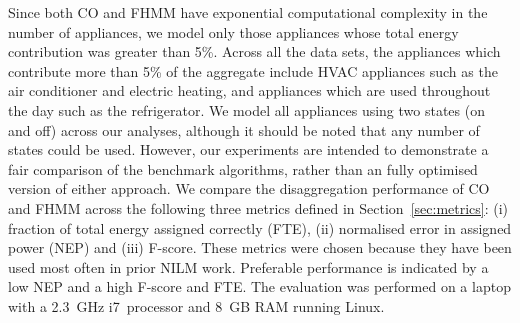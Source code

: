 \documentclass{sig-alternate}
\newcommand{\redcolor}[1]{\textcolor{red}{#1}}
\newcommand{\secref}[1]{Section~\ref{#1}}
\newcommand{\tabref}[1]{Table~\ref{#1}}
\begin{document}
Since both CO and FHMM have exponential computational complexity in the number of appliances, we model only those appliances whose total energy contribution was greater than 5\%. Across all the data sets, the appliances which contribute more than 5\% of the aggregate include HVAC appliances such as the air conditioner and electric heating, and appliances which are used throughout the day such as the refrigerator. We model all appliances using two states (on and off) across our analyses, although it should be noted that any number of states could be used. However, our experiments are intended to demonstrate a fair comparison of the benchmark algorithms, rather than an fully optimised version of either approach.
We compare the disaggregation performance of CO and FHMM across the following three metrics defined in \secref{sec:metrics}: (i) fraction of total energy assigned correctly (FTE), (ii) normalised error in assigned power (NEP) and (iii) F-score. These metrics were chosen because they have been used most often in prior NILM work. Preferable performance is indicated by a low NEP and a high F-score and FTE. The evaluation was performed on a laptop with a 2.3~GHz i7~processor and 8~GB RAM running Linux.

\end{document}
